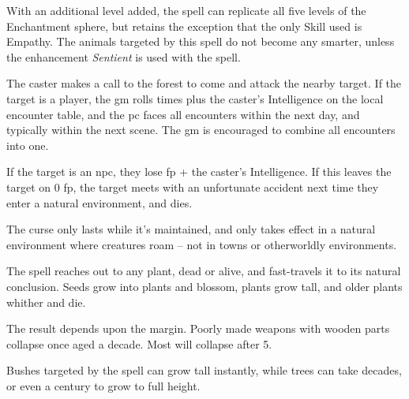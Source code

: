 \begin{multicols}{2}

With an additional level added, the spell can replicate all five levels of the Enchantment sphere, but retains the exception that the only Skill used is Empathy.
The animals targeted by this spell do not become any smarter, unless the enhancement \textit{Sentient} is used with the spell.

\spelllevel

\label{forestsCall}%
The caster makes a call to the forest to come and attack the nearby target.
If the target is a player, the \gls{gm} rolls  times plus the caster's Intelligence on the local encounter table, and the \gls{pc} faces all encounters within the next day, and typically within the next scene.
The \gls{gm} is encouraged to combine all encounters into one.

If the target is an \gls{npc}, they lose  \gls{fp} + the caster's Intelligence.
If this leaves the target on 0 \gls{fp}, the target meets with an unfortunate accident next time they enter a natural environment, and dies.

The curse only lasts while it's maintained, and only takes effect in a natural environment where creatures roam -- not in towns or otherworldly environments.

The spell reaches out to any plant, dead or alive, and fast-travels it to its natural conclusion.
Seeds grow into plants and blossom, plants grow tall, and older plants whither and die.

The result depends upon the margin.
Poorly made weapons with wooden parts collapse once aged a decade.
Most will collapse after 5.

Bushes targeted by the spell can grow tall instantly, while trees can take decades, or even a century to grow to full height.

\end{multicols}
